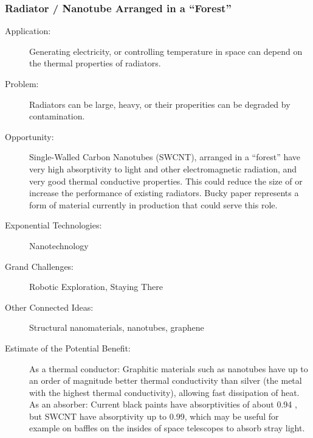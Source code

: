 \subsubsection{Radiator  / Nanotube Arranged in a ``Forest''}
\label{thermal-materials}
\begin{description}  \item[Application:] Generating electricity, or controlling temperature  in space can depend on the thermal properties of radiators.
 
\item[Problem:] Radiators can be  large, heavy, or their properities can be degraded by contamination.
 
\item[Opportunity:] Single-Walled Carbon Nanotubes (SWCNT), arranged in a ``forest'' have very high  absorptivity to light and other electromagnetic radiation, and very good  thermal conductive properties. This could reduce the size of or  increase the performance of existing radiators. Bucky paper  \cite{Wang2008, nanolab, Wardle2008}  represents a form of material currently in production that could serve  this role.
 
\item[Exponential Technologies:]  Nanotechnology
 
\item[Grand Challenges:] Robotic  Exploration, Staying There
 
\item[Other Connected Ideas:]  Structural nanomaterials, nanotubes, graphene
 
\item[Estimate of the Potential  Benefit:] As a thermal conductor: Graphitic materials such as nanotubes  have up to an order of magnitude better thermal conductivity than silver  (the metal with the highest thermal conductivity), allowing fast  dissipation of heat. As an absorber: Current black paints have  absorptivities of about 0.94 \cite{solaracfaq}, but SWCNT have absorptivity up to  0.99, which may be useful for example on baffles on the insides of space  telescopes to absorb stray light.
 

\end{description}
